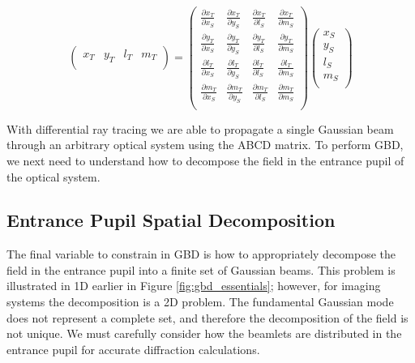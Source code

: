 \begin{center}
\begin{equation}
    \begin{pmatrix}
    x_{T} & y_{T} & l_{T} & m_{T} \\
    \end{pmatrix}
    =
    \begin{pmatrix}
    \frac{\partial x_T}{\partial x_S} & \frac{\partial x_T}{\partial y_S} & \frac{\partial x_T}{\partial l_S} & \frac{\partial x_T}{\partial m_S}  \\
    \frac{\partial y_T}{\partial x_S} & \frac{\partial y_T}{\partial y_S} & \frac{\partial y_T}{\partial l_S} & \frac{\partial y_T}{\partial m_S}  \\
    \frac{\partial l_T}{\partial x_S} & \frac{\partial l_T}{\partial y_S} & \frac{\partial l_T}{\partial l_S} & \frac{\partial l_T}{\partial m_S} \\
    \frac{\partial m_T}{\partial x_S} & \frac{\partial m_T}{\partial y_S} & \frac{\partial m_T}{\partial l_S} & \frac{\partial m_T}{\partial m_S} \\
    \end{pmatrix}
    \begin{pmatrix}
    x_S \\
    y_S \\
    l_S \\
    m_S \\
    \end{pmatrix}
    \label{eq:diffmat_rays}
\end{equation}
\end{center}
 
With differential ray tracing we are able to propagate a single Gaussian beam through an arbitrary optical system using the ABCD matrix. To perform GBD, we next need to understand how to decompose the field in the entrance pupil of the optical system.

\subsection{Entrance Pupil Spatial Decomposition}
The final variable to constrain in GBD is how to appropriately decompose the field in the entrance pupil into a finite set of Gaussian beams. This problem is illustrated in 1D earlier in Figure \ref{fig:gbd_essentials}; however, for imaging systems the decomposition is a 2D problem. The fundamental Gaussian mode does not represent a complete set\cite{koshel_novel_2001}, and therefore the decomposition of the field is not unique. We must carefully consider how the beamlets are distributed in the entrance pupil for accurate diffraction calculations. 

